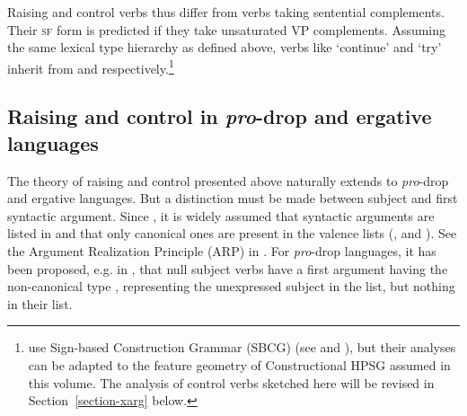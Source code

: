 Raising  and control verbs thus differ from verbs taking sentential complements. Their \textsc{sf} form is
predicted if they take unsaturated VP complements. Assuming the same lexical type hierarchy as
defined above, verbs like  `continue' and  `try' inherit from
 and 
 respectively.\footnote{\citeauthor{HenriandLaurens2011} use Sign-based Construction Grammar (SBCG) (see
   and
  ), but their analyses can be adapted to the
  feature geometry of Constructional HPSG \citep{Sag97a} assumed in this volume. The analysis of
  control verbs sketched here will be revised in Section~\ref{section-xarg} below.}


\subsection{Raising and control in \emph{pro}-drop and ergative languages}

The theory of raising and control presented above naturally extends to \emph{pro}-drop and ergative
languages.  But a distinction must be made between subject and first syntactic argument. Since \citet*{BMS2001a}, it is widely assumed
  that syntactic arguments are listed in \argst and
that only canonical ones are present in the valence lists (\subj, \spr and \comps). See the Argument Realization Principle (ARP) in \crossrefchapterw[\pageref{properties:ex-ARP}]{properties}.
For \emph{pro}-drop languages,
it has been proposed, e.g. in \citep[]{ManningandSag1998}, that null subject verbs have
a first argument having the non-canonical  type , representing the unexpressed subject in the \argst list, but nothing in
their \subj list.

